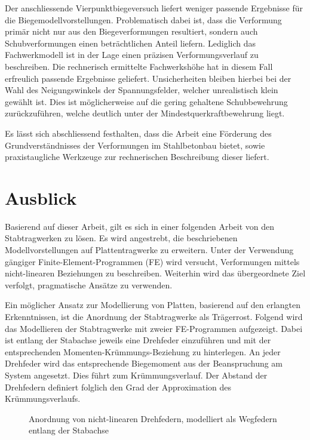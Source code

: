 \documentclass[
  12pt,
  letterpaper,
  egregdoesnotlikesansseriftitles]{scrreprt}
\begin{document}
Der anschliessende Vierpunktbiegeversuch liefert weniger passende
Ergebnisse für die Biegemodellvorstellungen. Problematisch dabei ist,
dass die Verformung primär nicht nur aus den Biegeverformungen
resultiert, sondern auch Schubverformungen einen beträchtlichen Anteil
liefern. Lediglich das Fachwerkmodell ist in der Lage einen präzisen
Verformungsverlauf zu beschreiben. Die rechnerisch ermittelte
Fachwerkshöhe hat in diesem Fall erfreulich passende Ergebnisse
geliefert. Unsicherheiten bleiben hierbei bei der Wahl des
Neigungswinkels der Spannungsfelder, welcher unrealistisch klein gewählt
ist. Dies ist möglicherweise auf die gering gehaltene Schubbewehrung
zurückzuführen, welche deutlich unter der Mindestquerkraftbewehrung
liegt.

Es lässt sich abschliessend festhalten, dass die Arbeit eine Förderung
des Grundverständnisses der Verformungen im Stahlbetonbau bietet, sowie
praxistaugliche Werkzeuge zur rechnerischen Beschreibung dieser liefert.

\section{Ausblick}\label{ausblick}

Basierend auf dieser Arbeit, gilt es sich in einer folgenden Arbeit von
den Stabtragwerken zu lösen. Es wird angestrebt, die beschriebenen
Modellvorstellungen auf Plattentragwerke zu erweitern. Unter der
Verwendung gängiger Finite-Element-Programmen (FE) wird versucht,
Verformungen mittels nicht-linearen Beziehungen zu beschreiben.
Weiterhin wird das übergeordnete Ziel verfolgt, pragmatische Ansätze zu
verwenden.

Ein möglicher Ansatz zur Modellierung von Platten, basierend auf den
erlangten Erkenntnissen, ist die Anordnung der Stabtragwerke als
Trägerrost. Folgend wird das Modellieren der Stabtragwerke mit zweier
FE-Programmen aufgezeigt. Dabei ist entlang der Stabachse jeweils eine
Drehfeder einzuführen und mit der entsprechenden
Momenten-Krümmungs-Beziehung zu hinterlegen. An jeder Drehfeder wird das
entsprechende Biegemoment aus der Beanspruchung am System angesetzt.
Dies führt zum Krümmungsverlauf. Der Abstand der Drehfedern definiert
folglich den Grad der Approximation des Krümmungsverlaufs.

\begin{figure}[H]


\caption{\label{fig-cubus_stab}Anordnung von nicht-linearen Drehfedern,
modelliert als Wegfedern entlang der Stabachse}

\end{figure}%
\end{document}
